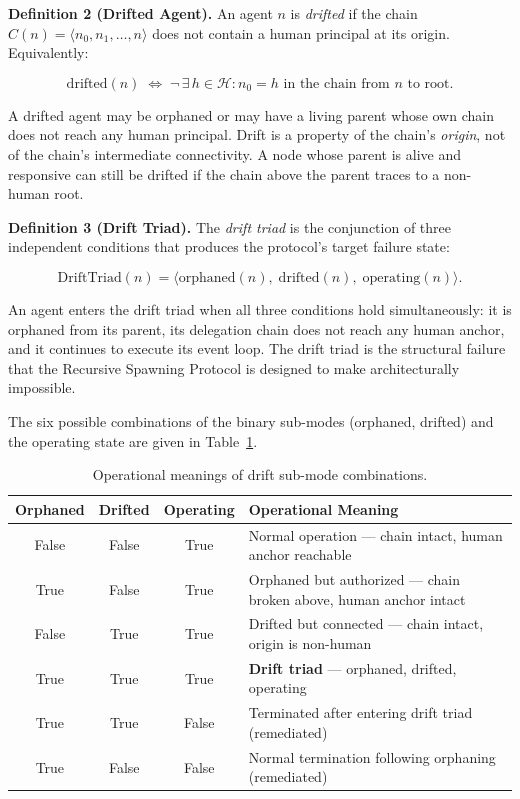 \medskip
\noindent\textbf{Definition 2 (Drifted Agent).}
An agent $n$ is \emph{drifted} if the chain $C(n) = \langle n_0, n_1, \ldots, n \rangle$ does not contain a human principal at its origin. Equivalently:

\begin{equation}
\mathrm{drifted}(n) \;\iff\; \neg\,\exists\, h \in \mathcal{H} : n_0 = h \text{ in the chain from } n \text{ to root}.
\label{eq:drifted-def}
\end{equation}

A drifted agent may be orphaned or may have a living parent whose own chain does not reach any human principal. Drift is a property of the chain's \emph{origin}, not of the chain's intermediate connectivity. A node whose parent is alive and responsive can still be drifted if the chain above the parent traces to a non-human root.

\medskip
\noindent\textbf{Definition 3 (Drift Triad).}
The \emph{drift triad} is the conjunction of three independent conditions that produces the protocol's target failure state:

\begin{equation}
\mathrm{DriftTriad}(n) = \langle \mathrm{orphaned}(n),\; \mathrm{drifted}(n),\; \mathrm{operating}(n) \rangle.
\label{eq:drift-triad}
\end{equation}

An agent enters the drift triad when all three conditions hold simultaneously: it is orphaned from its parent, its delegation chain does not reach any human anchor, and it continues to execute its event loop. The drift triad is the structural failure that the Recursive Spawning Protocol is designed to make architecturally impossible.

The six possible combinations of the binary sub-modes (orphaned, drifted) and the operating state are given in Table~\ref{tab:drift-submodes}.

\begin{table}[h]
\centering
\begin{tabular}{c|c|c|p{5cm}}
\textbf{Orphaned} & \textbf{Drifted} & \textbf{Operating} & \textbf{Operational Meaning} \\ \hline
False & False & True  & Normal operation — chain intact, human anchor reachable \\
True  & False & True  & Orphaned but authorized — chain broken above, human anchor intact \\
False & True  & True  & Drifted but connected — chain intact, origin is non-human \\
True  & True  & True  & \textbf{Drift triad} — orphaned, drifted, operating \\
True  & True  & False & Terminated after entering drift triad (remediated) \\
True  & False & False & Normal termination following orphaning (remediated)
\end{tabular}
\caption{Operational meanings of drift sub-mode combinations.}
\label{tab:drift-submodes}
\end{table}

